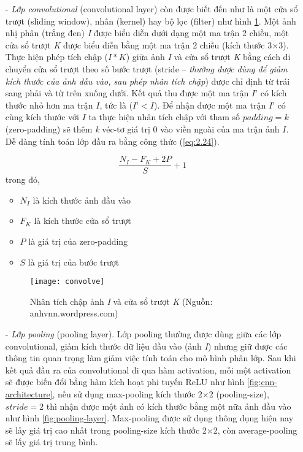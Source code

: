 \begin{itemize}
\item[-] \emph{Lớp convolutional} (convolutional layer) còn được biết đến như là một cửa sổ trượt (sliding window), nhân (kernel) hay bộ lọc (filter) như hình \ref{fig:convolve}. Một ảnh nhị phân (trắng đen) \emph{I} được biểu diễn dưới dạng một ma trận 2 chiều, một cửa sổ trượt \emph{K} được biểu diễn bằng một ma trận 2 chiều (kích thước 3$\times$3). Thực hiện phép tích chập ($I*K$) giữa ảnh \emph{I} và cửa sổ trượt \emph{K} bằng cách di chuyển cửa sổ trượt theo số bước trượt (stride -- \emph{thường được dùng để giảm kích thước của ảnh đầu vào, sau phép nhân tích chập}) được chỉ định từ trái sang phải và từ trên xuống dưới. Kết quả thu được một ma trận $I$' có kích thước nhỏ hơn ma trận $I$, tức là ($I$'$<  I$). Để nhận được một ma trận $I$' có cùng kích thước với $I$ ta thực hiện nhân tích chập với tham số $padding = k$ (zero-padding) sẽ thêm \emph{k} véc-tơ giá trị 0 vào viền ngoài của ma trận ảnh $I$. Dễ dàng tính toán lớp đầu ra bằng công thức (\ref{eq:2.24}).\par
\begin{equation}\label{eq:2.24}
\frac{N_I - F_K + 2P}{S} + 1
\end{equation}
trong đó,
\begin{itemize}
\item $N_I$ là kích thước ảnh đầu vào
\item $F_K$ là kích thước cửa sổ trượt 
\item $P$ là giá trị của zero-padding
\item $S$ là giá trị của bước trượt
\end{itemize}

\begin{figure}[h]
	\centering
	\texttt{[image: convolve]}
	\caption[Nhân tích chập ảnh \emph{I} và cửa sổ trượt \emph{K}]{Nhân tích chập ảnh \emph{I} và cửa sổ trượt \emph{K} (Nguồn: anhvnn.wordpress.com)}
	\label{fig:convolve}
\end{figure}

\item[-] \emph{Lớp pooling} (pooling layer).
Lớp pooling thường được dùng giữa các lớp convolutional, giảm kích thước dữ liệu đầu vào (ảnh \emph{I}) nhưng giữ được các thông tin quan trọng làm giảm việc tính toán cho mô hình phân lớp. Sau khi kết quả đầu ra của convolutional đi qua hàm activation, mỗi một activation sẽ được biến đổi bằng hàm kích hoạt phi tuyến ReLU như hình \ref{fig:cnn-architecture}, nếu sử dụng max-pooling kích thước 2$\times$2 (pooling-size), $stride = 2$ thì nhận được một ảnh có kích thước bằng một nữa ảnh đầu vào như hình \ref{fig:pooling-layer}. Max-pooling được sử dụng thông dụng hiện nay sẽ lấy giá trị cao nhất trong pooling-size kích thước 2$\times$2, còn average-pooling sẽ lấy giá trị trung bình.


\end{itemize}
